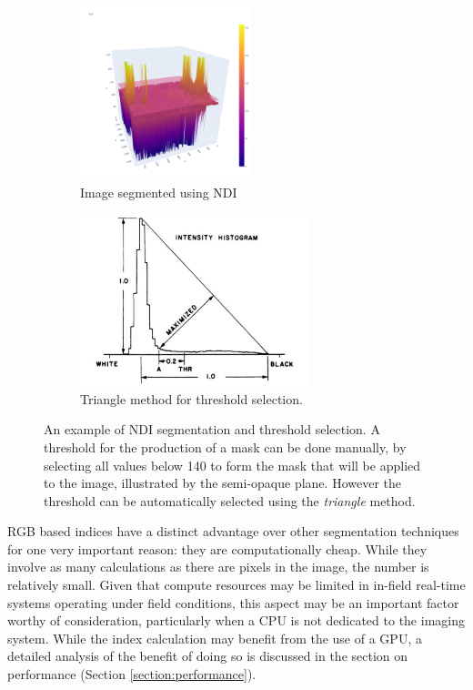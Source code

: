\documentclass[letterpaper]{report}
\begin{document}
{\begin{figure}[h!]
	\centering
	\begin{subfigure}[h]{.48\textwidth}
	  \centering
	  \includegraphics[height=5cm]{./figures/ndi-1-of-2.png}
	  \caption{Image segmented using NDI}
	  \label{fig:ndi-1}
	\end{subfigure}
	\hfil
	\begin{subfigure}[h]{.48\textwidth}
	  \centering
	  \includegraphics[height=5cm]{./figures/triangle-algorithm}
	  \caption{Triangle method for threshold selection.}
	  \label{fig:ndi-2}
	\end{subfigure}
	\caption[NDI segmentation and threshold selection]{An example of NDI segmentation and threshold selection. A threshold for the production of a mask can be done manually,  by selecting all values below 140 to form the mask that will be applied to the image, illustrated by the semi-opaque plane. However the threshold can be automatically selected using the \textit{triangle} method.}
	\label{fig:ndi-segmentation}
\end{figure}

RGB based indices have a distinct advantage over other segmentation techniques for one very important reason: they are computationally cheap. While they involve as many calculations as there are pixels in the image, the number is relatively small. Given that compute resources may be limited in in-field real-time systems operating under field conditions, this aspect may be an important factor worthy of consideration, particularly when a CPU is not dedicated to the imaging system. While the index calculation may benefit from the use of  a GPU, a detailed analysis of the benefit of doing so is discussed in the section on performance (Section \ref{section:performance}).

}
\end{document}
